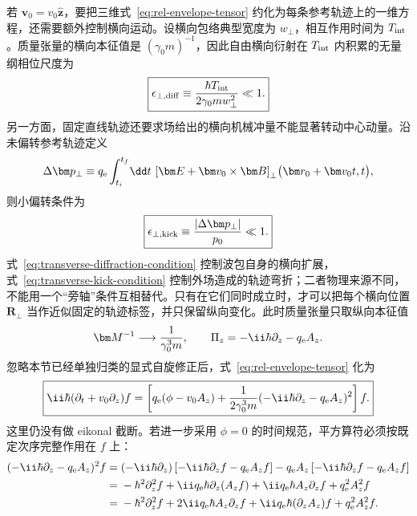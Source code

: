 若 $\bm v_0=v_0\hat{\bm z}$，要把三维式~\eqref{eq:rel-envelope-tensor} 约化为每条参考轨迹上的一维方程，还需要额外控制横向运动。设横向包络典型宽度为 $w_\perp$，相互作用时间为 $T_{\rm int}$。质量张量的横向本征值是 $(\gamma_0m)^{-1}$，因此自由横向衍射在 $T_{\rm int}$ 内积累的无量纲相位尺度为
\begin{equation}
\boxed{
\epsilon_{\perp,{\rm diff}}
\equiv
\frac{\hbar T_{\rm int}}{2\gamma_0m w_\perp^2}
\ll1.}
\label{eq:transverse-diffraction-condition}
\end{equation}
另一方面，固定直线轨迹还要求场给出的横向机械冲量不能显著转动中心动量。沿未偏转参考轨迹定义
\begin{equation}
\Delta\bm p_\perp
\equiv
q_{\rm e}\int_{t_i}^{t_f}\!\dd t\,
\left[
\bm E+\bm v_0\times\bm B
\right]_\perp\!\bigl(\bm r_0+\bm v_0t,t\bigr),
\end{equation}
则小偏转条件为
\begin{equation}
\boxed{
\epsilon_{\perp,{\rm kick}}
\equiv\frac{|\Delta\bm p_\perp|}{p_0}\ll1.}
\label{eq:transverse-kick-condition}
\end{equation}
式~\eqref{eq:transverse-diffraction-condition} 控制波包自身的横向扩展，式~\eqref{eq:transverse-kick-condition} 控制外场造成的轨迹弯折；二者物理来源不同，不能用一个“旁轴”条件互相替代。只有在它们同时成立时，才可以把每个横向位置 $\bm R_\perp$ 当作近似固定的轨迹标签，并只保留纵向变化。此时质量张量只取纵向本征值
\begin{equation}
\bm M^{-1}\longrightarrow\frac{1}{\gamma_0^3m},
\qquad
\Pi_z=-\ii\hbar\partial_z-q_{\rm e}A_z.
\end{equation}
忽略本节已经单独归类的显式自旋修正后，式~\eqref{eq:rel-envelope-tensor} 化为
\begin{equation}
\boxed{
\ii\hbar(\partial_t+v_0\partial_z)f
=\left[
q_{\rm e}(\phi-v_0A_z)
+\frac{1}{2\gamma_0^3m}
(-\ii\hbar\partial_z-q_{\rm e}A_z)^2
\right]f.}
\label{eq:rel-envelope-1d-covariant}
\end{equation}
这里仍没有做 eikonal 截断。若进一步采用 $\phi=0$ 的时间规范，平方算符必须按既定次序完整作用在 $f$ 上：
\begin{align}
(-\ii\hbar\partial_z-q_{\rm e}A_z)^2f
={}&(-\ii\hbar\partial_z)
\left[-\ii\hbar\partial_zf-q_{\rm e}A_zf\right]
-q_{\rm e}A_z
\left[-\ii\hbar\partial_zf-q_{\rm e}A_zf\right]\\
={}&-\hbar^2\partial_z^2f
+\ii q_{\rm e}\hbar\partial_z(A_zf)
+\ii q_{\rm e}\hbar A_z\partial_zf
+q_{\rm e}^2A_z^2f\\
={}&-\hbar^2\partial_z^2f
+2\ii q_{\rm e}\hbar A_z\partial_zf
+\ii q_{\rm e}\hbar(\partial_zA_z)f
+q_{\rm e}^2A_z^2f.
\label{eq:Pi-square-expanded}
\end{align}
